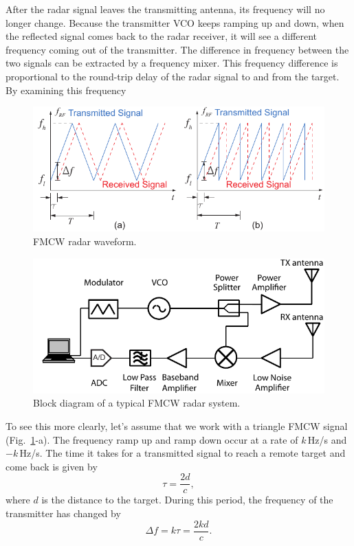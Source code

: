 \documentclass[letterpaper, 11pt]{article}
\begin{document}
After the radar signal leaves the transmitting antenna, its frequency will no longer change. Because the transmitter VCO keeps ramping up and down, when the reflected signal comes back to the radar receiver, it will see a different frequency coming out of the transmitter. The difference in frequency between the two signals can be extracted by a frequency mixer. This frequency difference is proportional to the round-trip delay of the radar signal to and from the target. By examining this frequency 

\begin{figure}[ht]
	\centering
	\includegraphics{fmcwwaveform}
	\caption{FMCW radar waveform.}
	\label{fig:fmcwwaveform}
\end{figure} 

\begin{figure}[ht]
	\centering
	\includegraphics{fmcwsystem}
	\caption{Block diagram of a typical FMCW radar system.}
	\label{fig:fmcwsystem}
\end{figure} 

To see this more clearly, let's assume that we work with a triangle FMCW signal (Fig.~\ref{fig:fmcwwaveform}-a). The frequency ramp up and ramp down occur at a rate of $k$\,Hz/s and $-k$\,Hz/s. The time it takes for a transmitted signal to reach a remote target and come back is given by 
\[
\tau = \frac{2d}{c},
\]
where $d$ is the distance to the target. During this period, the frequency of the transmitter has changed by 
\[ 
\Delta f = k\tau = \frac{2kd}{c}.
\] 
\end{document}

